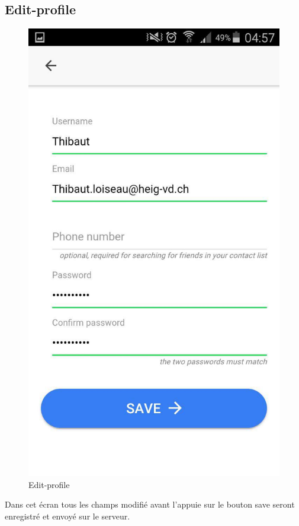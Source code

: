 \documentclass[french]{article}
\begin{document}
	\subsection{Edit-profile}
		\begin{figure}[H]
			\centering
			\includegraphics[scale=0.4]{../screenshot/screenshot-edit-profile}
			\caption{Edit-profile}
			\label{Edit-profile}
		\end{figure} 
	Dans cet écran tous les champs modifié avant l'appuie sur le bouton save seront enregistré et envoyé sur le serveur.
\end{document}
